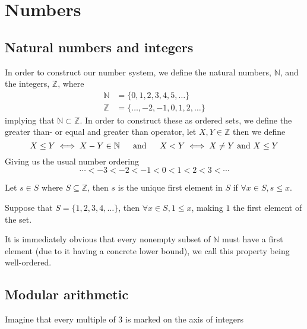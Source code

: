 \section{Numbers}
\subsection{Natural numbers and integers}
In order to construct our number system, we define the natural numbers, $\mathbb{N}$, and the integers, $\mathbb{Z}$, where
\begin{align*}
    \mathbb{N}&=\{0,1,2,3,4,5,\ldots\} \\
    \mathbb{Z}&=\{\ldots,-2,-1,0,1,2,\ldots\}
\end{align*}
implying that $\mathbb{N}\subset\mathbb{Z}$. In order to construct these as ordered sets, we define the greater than- or equal and  greater than operator, let $X,Y\in\mathbb{Z}$ then we define
\[
    X\leq Y\iff X-Y\in\mathbb{N}\hskip 16pt \text{and}\hskip 16pt X<Y\iff X\neq Y\text{ and } X\leq Y
\]
Giving us the usual number ordering
\[
    \cdots<-3<-2<-1<0<1<2<3<\cdots
\]\vskip -10pt
\begin{defi}
    Let $s\in S$ where $S\subseteq\mathbb{Z}$, then $s$ is the unique first element in $S$ if $\forall x\in S,s\leq x$.
\end{defi}
\begin{exmp}
    Suppose that $S=\{1,2,3,4,\ldots\}$, then $\forall x\in S,1\leq x$, making $1$ the first element of the set.
\end{exmp}
It is immediately obvious that every nonempty subset of $\mathbb{N}$ must have a first element (due to it having a concrete lower bound), we call this property being well-ordered.
\subsection{Modular arithmetic}
Imagine that every multiple of 3 is marked on the axis of integers
\begin{figure}[!h]
    \centering
\end{figure}

